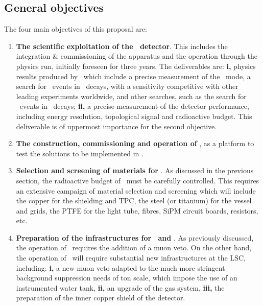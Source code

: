 
\subsection*{General objectives}

The four main objectives of this proposal are:
\begin{enumerate}
\item {\bf The scientific exploitation of the \Next\ detector}. This includes the integration \& commissioning of the apparatus and the operation through the physics run, initially foreseen for three years. The deliverables are: {\bf i,} physics results produced by \Next\ which include a precise measurement of the \bbtnu\ mode, a search for \bbonu\ events in \XE\ decays, with a sensitivity competitive with other leading experiments worldwide, and other searches, such as the search for \bbonu\ events in \XEX\ decays; {\bf ii,} a precise measurement of the detector performance, including energy resolution, topological signal and radioactive budget. This deliverable is of uppermost importance for the second objective. 
\item {\bf The construction, commissioning and operation of \HDEMO}, as a platform to test the solutions to be implemented in \NHD.  
\item {\bf Selection and screening of materials for \NHD}. As discussed in the previous section, the radioactive budget of \NHD\ must be carefully controlled. This requires an extensive campaign of material selection and screening which will include the copper for the shielding and TPC, the steel (or titanium) for the vessel and grids, the PTFE for the light tube, fibres, SiPM circuit boards, resistors, etc. 
\item {\bf Preparation of the infrastructures for \Next\ and \NHD}. As previously discussed, the operation of \Next\ requires the addition of a muon veto. On the other hand, the operation of \NHD\ will require substantial new infrastructures at the LSC, including: {\bf i,} a new muon veto adapted to the much more stringent background suppression needs of ton scale, which impose the use of an instrumented water tank, {\bf ii,} an upgrade of the gas system, {\bf iii,} the preparation of the inner copper shield of the detector. 


\end{enumerate}
